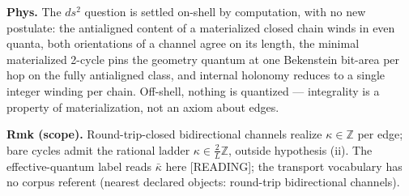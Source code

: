 \begin{theorem}
\textbf{Phys.} The $ds^2$ question is settled on-shell by computation, with no new postulate: the antialigned content of a materialized closed chain winds in even quanta, both orientations of a channel agree on its length, the minimal materialized 2-cycle pins the geometry quantum at one Bekenstein bit-area per hop on the fully antialigned class, and internal holonomy reduces to a single integer winding per chain. Off-shell, nothing is quantized — integrality is a property of materialization, not an axiom about edges.

\textbf{Rmk (scope).} Round-trip-closed bidirectional channels realize $\kappa\in\mathbb Z$ per edge; bare cycles admit the rational ladder $\kappa\in\tfrac2L\mathbb Z$, outside hypothesis (ii). The effective-quantum label reads $\bar\kappa$ here [READING]; the transport vocabulary has no corpus referent (nearest declared objects: round-trip bidirectional channels).

\end{theorem}

